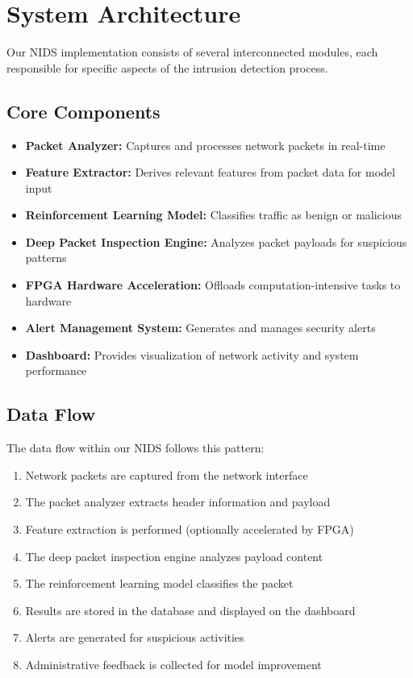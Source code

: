 \documentclass[12pt]{article}
\begin{document}
\section{System Architecture}
Our NIDS implementation consists of several interconnected modules, each responsible for specific aspects of the intrusion detection process.

\subsection{Core Components}
\begin{itemize}
  \item \textbf{Packet Analyzer:} Captures and processes network packets in real-time
  \item \textbf{Feature Extractor:} Derives relevant features from packet data for model input
  \item \textbf{Reinforcement Learning Model:} Classifies traffic as benign or malicious
  \item \textbf{Deep Packet Inspection Engine:} Analyzes packet payloads for suspicious patterns
  \item \textbf{FPGA Hardware Acceleration:} Offloads computation-intensive tasks to hardware
  \item \textbf{Alert Management System:} Generates and manages security alerts
  \item \textbf{Dashboard:} Provides visualization of network activity and system performance
\end{itemize}

\subsection{Data Flow}
The data flow within our NIDS follows this pattern:
\begin{enumerate}
  \item Network packets are captured from the network interface
  \item The packet analyzer extracts header information and payload
  \item Feature extraction is performed (optionally accelerated by FPGA)
  \item The deep packet inspection engine analyzes payload content
  \item The reinforcement learning model classifies the packet
  \item Results are stored in the database and displayed on the dashboard
  \item Alerts are generated for suspicious activities
  \item Administrative feedback is collected for model improvement
\end{enumerate}
\end{document}
